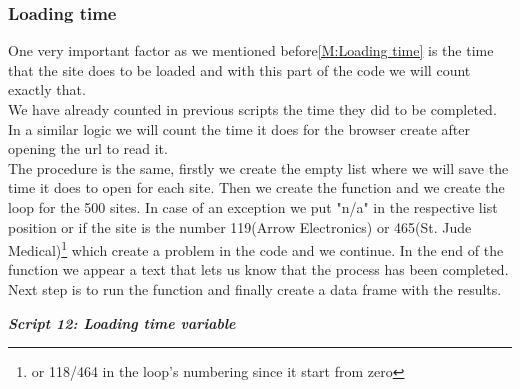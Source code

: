 \documentclass{article}
\begin{document}
\subsubsection{Loading time}
One very important factor as we mentioned before\ref{M:Loading time} is the time that the site does to be loaded and with this part of the code we will count exactly that.\\
We have already counted in previous scripts the time they did to be completed. In a similar logic we will count the time it does for the browser create after opening the url to read it.\\
The procedure is the same, firstly we create the empty list where we will save the time it does to open for each site. Then we create the function and we create the loop for the 500 sites. In case of an exception we put "n/a" in the respective list position or if the site is the number 119(Arrow Electronics) or 465(St. Jude Medical)\footnote{or 118/464 in the loop's numbering since it start from zero} which create a problem in the code and we continue. In the end of the function we appear a text that lets us know that the process has been completed.\\
Next step is to run the function and finally create a data frame with the results.
\begin{center}
\textit{\textbf{Script 12: Loading time variable}}
\end{center}
\end{document}

